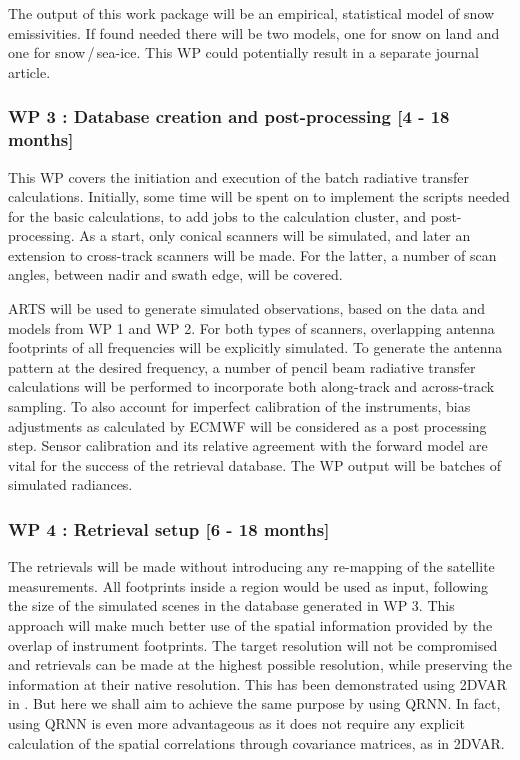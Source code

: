 \documentclass[12pt,oneside,a4paper]{article}
\begin{document}
The output of this work package will be an empirical, statistical model of
snow emissivities. If found needed there will be two models, one for snow on
land and one for snow\,/\,sea-ice. This WP could potentially result in a separate
journal article.
\vspace{-1.0ex}

\subsubsection*{WP 3 : Database creation and post-processing [4 - 18 months]}
%
\label{sec:database}	
This WP covers the initiation and execution of the batch radiative
transfer calculations. Initially, some time will be spent on to implement the
scripts needed for the basic calculations, to add jobs to the calculation
cluster, and post-processing. As a start, only conical scanners will be
simulated, and later an extension to cross-track scanners will be made. For the
latter, a number of scan angles, between nadir and swath edge, will be covered.

ARTS will be used to generate simulated observations, based on the data and
models from WP 1 and WP 2. For both types of scanners, overlapping antenna
footprints of all frequencies will be explicitly simulated. To generate the
antenna pattern at the desired frequency, a number of pencil beam radiative
transfer calculations will be performed to incorporate both along-track and
across-track sampling. To also account for imperfect calibration of the
instruments, bias adjustments as calculated by ECMWF will be considered as a
post processing step. Sensor calibration and its relative agreement with the
forward model are vital for the success of the retrieval database. The WP
output will be batches of simulated radiances.  \vspace{-1.0ex}


\subsubsection*{WP 4 : Retrieval setup [6 - 18 months]}
%
\label{sec:setup}
The retrievals will be made without introducing any re-mapping of the satellite
measurements. All footprints inside a region would be used as input, following
the size of the simulated scenes in the database generated in WP 3. This
approach will make much better use of the spatial information provided by the
overlap of instrument footprints. The target resolution will not be
compromised and retrievals can be made at the highest possible resolution,
while preserving the information at their native resolution. This has been
demonstrated using 2DVAR in \citet{duncan:anexp:19}. But here we shall aim to
achieve the same purpose by using QRNN. In fact, using QRNN is even more advantageous as it does not require any explicit calculation of the spatial correlations through covariance matrices, as in 2DVAR.
\end{document}
